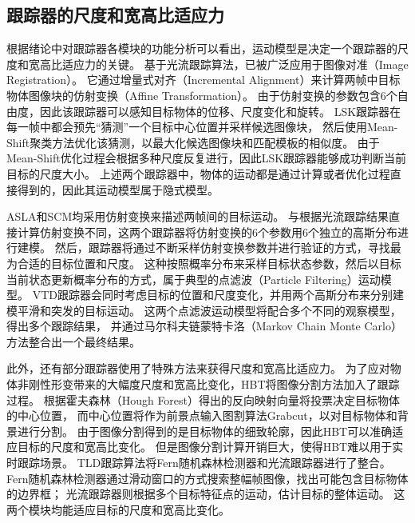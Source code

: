 \subsection{跟踪器的尺度和宽高比适应力}
根据绪论中对跟踪器各模块的功能分析可以看出，运动模型是决定一个跟踪器的尺度和宽高比适应力的关键。
\cite{survey51}基于光流跟踪算法，已被广泛应用于图像对准（Image Registration）。
它通过增量式对齐（Incremental Alignment）来计算两帧中目标物体图像块的仿射变换（Affine Transformation）。
由于仿射变换的参数包含6个自由度，因此该跟踪器可以感知目标物体的位移、尺度变化和旋转。
LSK跟踪器在每一帧中都会预先``猜测''一个目标中心位置并采样候选图像块，
然后使用Mean-Shift聚类方法优化该猜测，以最大化候选图像块和匹配模板的相似度。
由于Mean-Shift优化过程会根据多种尺度反复进行，因此LSK跟踪器能够成功判断当前目标的尺度大小。
上述两个跟踪器中，物体的运动都是通过计算或者优化过程直接得到的，因此其运动模型属于隐式模型。

ASLA和SCM均采用仿射变换来描述两帧间的目标运动。
与\cite{survey51}根据光流跟踪结果直接计算仿射变换不同，这两个跟踪器将仿射变换的6个参数用6个独立的高斯分布进行建模。
然后，跟踪器将通过不断采样仿射变换参数并进行验证的方式，寻找最为合适的目标位置和尺度。
这种按照概率分布来采样目标状态参数，然后以目标当前状态更新概率分布的方式，属于典型的点滤波（Particle Filtering）运动模型。
VTD跟踪器会同时考虑目标的位置和尺度变化，并用两个高斯分布来分别建模平滑和突发的目标运动。
这两个点滤波运动模型将配合多个不同的观察模型，得出多个跟踪结果，
并通过马尔科夫链蒙特卡洛（Markov Chain Monte Carlo）方法整合出一个最终结果。

此外，还有部分跟踪器使用了特殊方法来获得尺度和宽高比适应力。
为了应对物体非刚性形变带来的大幅度尺度和宽高比变化，HBT将图像分割方法加入了跟踪过程。
根据霍夫森林（Hough Forest）得出的反向映射向量将投票决定目标物体的中心位置，
而中心位置将作为前景点输入图割算法Grabcut，以对目标物体和背景进行分割。
由于图像分割得到的是目标物体的细致轮廓，因此HBT可以准确适应目标的尺度和宽高比变化。
但是图像分割计算开销巨大，使得HBT难以用于实时跟踪场景。
TLD跟踪算法将Fern随机森林检测器和光流跟踪器进行了整合。
Fern随机森林检测器通过滑动窗口的方式搜索整幅帧图像，找出可能包含目标物体的边界框；
光流跟踪器则根据多个目标特征点的运动，估计目标的整体运动。
这两个模块均能适应目标的尺度和宽高比变化。

